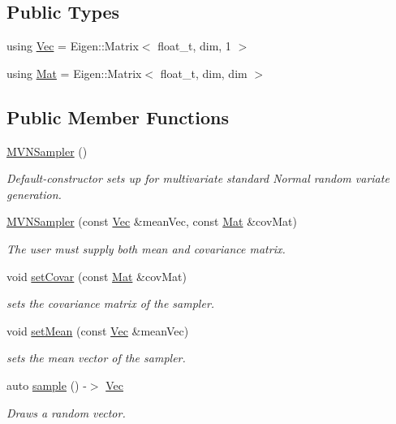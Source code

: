 \subsection*{Public Types}
\begin{DoxyCompactItemize}
\item 
using \hyperlink{classrvsamp_1_1MVNSampler_a1110bc1695c5c959914602dbaf2f6878}{Vec} = Eigen\+::\+Matrix$<$ float\+\_\+t, dim, 1 $>$
\item 
using \hyperlink{classrvsamp_1_1MVNSampler_ad6891a72b508fd59263c6d62b6bffd14}{Mat} = Eigen\+::\+Matrix$<$ float\+\_\+t, dim, dim $>$
\end{DoxyCompactItemize}
\subsection*{Public Member Functions}
\begin{DoxyCompactItemize}
\item 
\hyperlink{classrvsamp_1_1MVNSampler_a5fa6029b9bd840c4b08a01f67a97afc6}{M\+V\+N\+Sampler} ()
\begin{DoxyCompactList}\small\item\em Default-\/constructor sets up for multivariate standard Normal random variate generation. \end{DoxyCompactList}\item 
\hyperlink{classrvsamp_1_1MVNSampler_ac41aa5fc1e96bdd0f1577f8382958e7e}{M\+V\+N\+Sampler} (const \hyperlink{classrvsamp_1_1MVNSampler_a1110bc1695c5c959914602dbaf2f6878}{Vec} \&mean\+Vec, const \hyperlink{classrvsamp_1_1MVNSampler_ad6891a72b508fd59263c6d62b6bffd14}{Mat} \&cov\+Mat)
\begin{DoxyCompactList}\small\item\em The user must supply both mean and covariance matrix. \end{DoxyCompactList}\item 
void \hyperlink{classrvsamp_1_1MVNSampler_a9b50fc87640fe9c25595076539cf1c1d}{set\+Covar} (const \hyperlink{classrvsamp_1_1MVNSampler_ad6891a72b508fd59263c6d62b6bffd14}{Mat} \&cov\+Mat)
\begin{DoxyCompactList}\small\item\em sets the covariance matrix of the sampler. \end{DoxyCompactList}\item 
void \hyperlink{classrvsamp_1_1MVNSampler_a99b3bae7eb823d0bfcbbccf89555569e}{set\+Mean} (const \hyperlink{classrvsamp_1_1MVNSampler_a1110bc1695c5c959914602dbaf2f6878}{Vec} \&mean\+Vec)
\begin{DoxyCompactList}\small\item\em sets the mean vector of the sampler. \end{DoxyCompactList}\item 
auto \hyperlink{classrvsamp_1_1MVNSampler_a1b0b148b0d1223e35e317c804c9bf127}{sample} () -\/$>$ \hyperlink{classrvsamp_1_1MVNSampler_a1110bc1695c5c959914602dbaf2f6878}{Vec}
\begin{DoxyCompactList}\small\item\em Draws a random vector. \end{DoxyCompactList}\end{DoxyCompactItemize}
